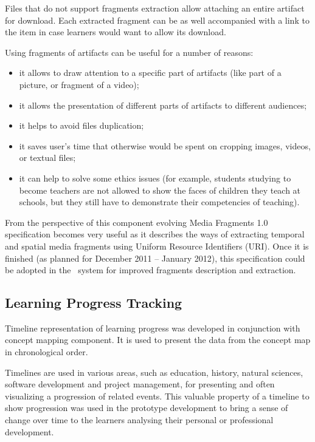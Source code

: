 Files that do not support fragments extraction allow attaching an entire
artifact for download. Each extracted fragment can be as well accompanied with a
link to the item in case learners would want to allow its download.

Using fragments of artifacts can be useful for a number of reasons:
\begin{itemize}
  \item it allows to draw attention to a specific part of artifacts (like part
  of a picture, or fragment of a video);
  \item it allows the presentation of different parts of artifacts to different
  audiences;
  \item it helps to avoid files duplication;
  \item it saves user's time that otherwise would be spent on cropping images,
  videos, or textual files;
  \item it can help to solve some ethics issues (for example, students studying
  to become teachers are not allowed to show the faces of children they teach at
  schools, but they still have to demonstrate their competencies of teaching).
\end{itemize}

From the perspective of this component evolving Media Fragments 1.0
specification \citep{MediaGroup2011} becomes very useful as it describes the
ways of extracting temporal and spatial media fragments using Uniform Resource
Identifiers (URI). Once it is finished (as planned for December 2011 -- January
2012), this specification could be adopted in the \ep~system for improved
fragments description and extraction.

\subsection{Learning Progress Tracking}
\label{sec:timeline}

Timeline representation of learning progress was developed in conjunction with
concept mapping component. It is used to present the data from the concept map
in chronological order.

Timelines are used in various areas, such as education, history, natural
sciences, software development and project management, for presenting and often
visualizing a progression of related events. This valuable property of a
timeline to show progression was used in the prototype development to bring a
sense of change over time to the learners analysing their personal or professional
development.

